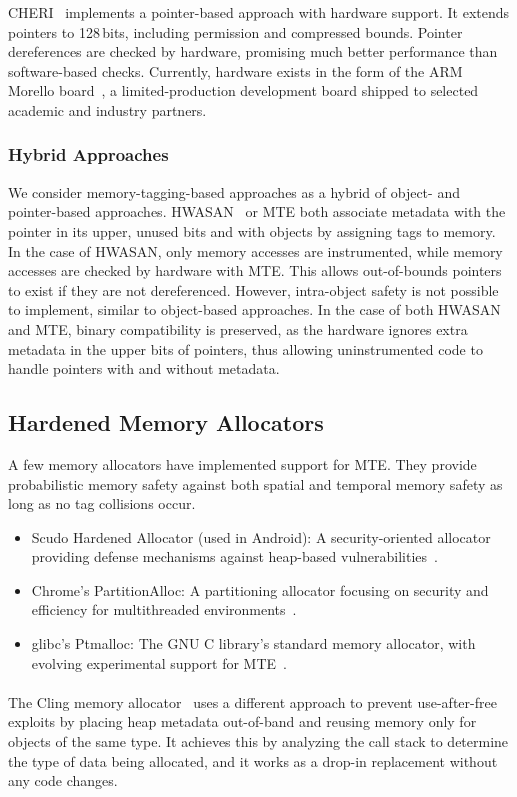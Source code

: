 CHERI~\cite{woodruff2014cheri} implements a pointer-based approach with hardware support.
It extends pointers to 128\,bits, including permission and compressed bounds.
Pointer dereferences are checked by hardware, promising much better performance than software-based checks.
Currently, hardware exists in the form of the ARM Morello board~\cite{UCAM-CL-TR-982}, a limited-production development board shipped to selected academic and industry partners.

\subsubsection{Hybrid Approaches}

We consider memory-tagging-based approaches as a hybrid of object- and pointer-based approaches.
\Ac{HWASAN}~\cite{serebryany2018memory} or \ac{MTE} both associate metadata with the pointer in its upper, unused bits and with objects by assigning tags to memory.
In the case of \ac{HWASAN}, only memory accesses are instrumented, while memory accesses are checked by hardware with \ac{MTE}.
This allows out-of-bounds pointers to exist if they are not dereferenced.
However, intra-object safety is not possible to implement, similar to object-based approaches.
In the case of both \ac{HWASAN} and \ac{MTE}, binary compatibility is preserved, as the hardware ignores extra metadata in the upper bits of pointers, thus allowing uninstrumented code to handle pointers with and without metadata.

\subsection{Hardened Memory Allocators}
\label{subsec:hardened-memory-allocators}

A few memory allocators have implemented support for \ac{MTE}.
They provide probabilistic memory safety against both spatial and temporal memory safety as long as no tag collisions occur.

\begin{itemize}
    \item Scudo Hardened Allocator (used in Android): A security-oriented allocator providing defense mechanisms against heap-based vulnerabilities~\cite{scudo_allocator}.
    \item Chrome's PartitionAlloc: A partitioning allocator focusing on security and efficiency for multithreaded environments~\cite{chrome_partition_alloc}.
    \item glibc's Ptmalloc: The GNU C library's standard memory allocator, with evolving experimental support for \ac{MTE}~\cite{glibc_ptmalloc}.
\end{itemize}

\paragraph{}
The Cling memory allocator~\cite{akritidis2010cling} uses a different approach to prevent use-after-free exploits by placing heap metadata out-of-band and reusing memory only for objects of the same type.
It achieves this by analyzing the call stack to determine the type of data being allocated, and it works as a drop-in replacement without any code changes.
